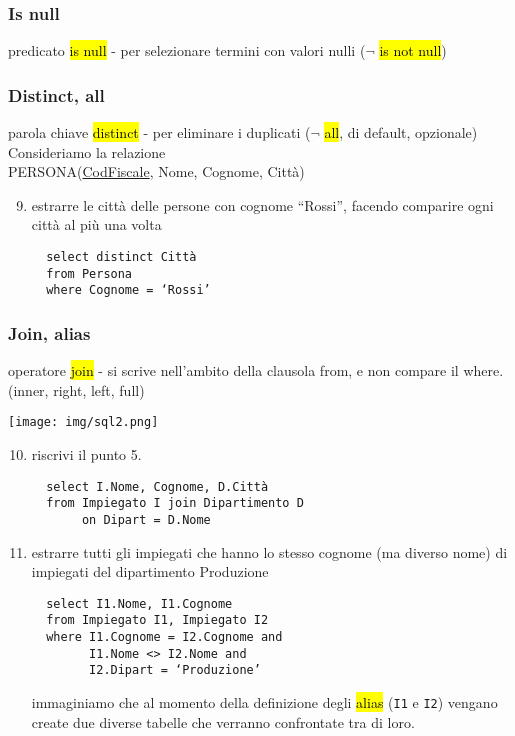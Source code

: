 \documentclass[a4paper]{article}
\begin{document}
\subsubsection{Is null}
predicato \hl{is null} - per selezionare termini con valori nulli ($\neg$ \hl{is not null})

\subsubsection{Distinct, all}
parola chiave \hl{distinct} - per eliminare i duplicati ($\neg$ \hl{all}, di default, opzionale)\medskip\medskip\medskip\\
%
Consideriamo la relazione\\
PERSONA(\underline{CodFiscale}, Nome, Cognome, Città)
%
\begin{enumerate}
  \setcounter{enumi}{8}
  \item estrarre le città delle persone con cognome “Rossi”, facendo comparire ogni città al più una volta
  \begin{verbatim}
  select distinct Città
  from Persona
  where Cognome = ‘Rossi’
  \end{verbatim}
\end{enumerate}

\subsubsection{Join, alias}
operatore \hl{join} - si scrive nell’ambito della clausola from, e non compare il where. (inner, right, left, full)
\begin{center}
      \texttt{[image: img/sql2.png]}
\end{center}
\begin{enumerate}
  \setcounter{enumi}{9}
  \item riscrivi il punto 5.
  \begin{verbatim}
  select I.Nome, Cognome, D.Città
  from Impiegato I join Dipartimento D
       on Dipart = D.Nome
  \end{verbatim}

  \item estrarre tutti gli impiegati che hanno lo stesso cognome (ma diverso nome) di impiegati del dipartimento Produzione
  \begin{verbatim}
  select I1.Nome, I1.Cognome
  from Impiegato I1, Impiegato I2
  where I1.Cognome = I2.Cognome and
        I1.Nome <> I2.Nome and
        I2.Dipart = ‘Produzione’
  \end{verbatim}
  immaginiamo che al momento della definizione degli \hl{alias} (\texttt{I1} e \texttt{I2}) vengano create due diverse tabelle che verranno confrontate tra di loro.
\end{enumerate}
\end{document}
